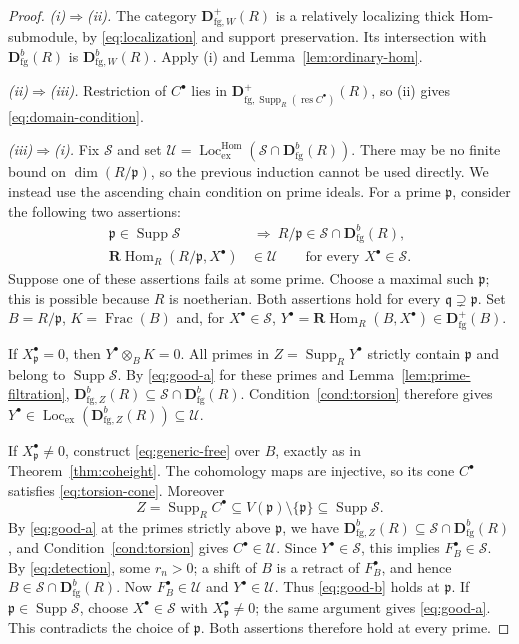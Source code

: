 \documentclass[11pt]{amsart}
\numberwithin{equation}{section}
\theoremstyle{definition}
\theoremstyle{remark}
\DeclareMathOperator{\Supp}{Supp}
\DeclareMathOperator{\Loc}{Loc}
\DeclareMathOperator{\Hom}{Hom}
\DeclareMathOperator{\Frac}{Frac}
\DeclareMathOperator{\res}{res}
\newcommand{\RHom}{\mathbf R\!\Hom}
\newcommand{\D}{\mathbf D}
\newcommand{\fg}{\mathrm{fg}}
\newcommand{\Lex}{\Loc_{\mathrm{ex}}}
\newcommand{\Lhom}{\Loc_{\mathrm{ex}}^{\Hom}}
\newcommand{\p}{\mathfrak p}
\newcommand{\q}{\mathfrak q}
\begin{document}
\begin{proof}
\emph{(i)$\Rightarrow$(ii).} The category $\D^+_{\fg,W}(R)$ is a relatively
localizing thick Hom-submodule, by \eqref{eq:localization} and support
preservation. Its intersection with $\D^b_{\fg}(R)$ is
$\D^b_{\fg,W}(R)$. Apply (i) and
Lemma~\ref{lem:ordinary-hom}.

\emph{(ii)$\Rightarrow$(iii).} Restriction of $C^{\bullet}$ lies in
$\D^+_{\fg,\Supp_R(\res C^{\bullet})}(R)$, so (ii) gives \eqref{eq:domain-condition}.

\emph{(iii)$\Rightarrow$(i).} Fix $\mathcal S$ and set
$\mathcal U=\Lhom(\mathcal S\cap\D^b_{\fg}(R))$. There may be no finite
bound on $\dim(R/\p)$, so the previous induction cannot be used directly.
We instead use the ascending chain condition on prime ideals. For a
prime $\p$, consider the following two assertions:
\begin{align}
 \p\in\Supp\mathcal S&\ \Longrightarrow\ R/\p\in\mathcal S\cap\D^b_{\fg}(R),
 \label{eq:good-a}\\
 \RHom_R(R/\p,X^{\bullet})&\in\mathcal U\qquad\text{for every }X^{\bullet}\in\mathcal S.
 \label{eq:good-b}
\end{align}
Suppose one of these assertions fails at some prime. Choose a
maximal such $\p$; this is possible because $R$ is noetherian.
Both assertions hold for every $\q\supsetneq\p$.
Set $B=R/\p$, $K=\Frac(B)$ and, for $X^{\bullet}\in\mathcal S$,
$Y^{\bullet}=\RHom_R(B,X^{\bullet})\in\D^+_{\fg}(B)$.

If $X_\p^{\bullet}=0$, then $Y^{\bullet}\otimes_BK=0$. All primes in $Z=\Supp_R Y^{\bullet}$ strictly
contain $\p$ and belong to $\Supp\mathcal S$. By
\eqref{eq:good-a} for these primes and Lemma~\ref{lem:prime-filtration},
$\D^b_{\fg,Z}(R)\subseteq\mathcal S\cap\D^b_{\fg}(R)$. Condition~\ref{cond:torsion}
therefore gives $Y^{\bullet}\in\Lex(\D^b_{\fg,Z}(R))\subseteq\mathcal U$.

If $X_\p^{\bullet}\ne0$, construct \eqref{eq:generic-free} over $B$, exactly as in
Theorem~\ref{thm:coheight}. The cohomology maps are injective, so its cone
$C^{\bullet}$ satisfies \eqref{eq:torsion-cone}. Moreover
\[
 Z=\Supp_R C^{\bullet}\subseteq V(\p)\setminus\{\p\}
 \subseteq\Supp\mathcal S.
\]
By \eqref{eq:good-a} at the primes strictly above $\p$, we have
$\D^b_{\fg,Z}(R)\subseteq\mathcal S\cap\D^b_{\fg}(R)$, and
Condition~\ref{cond:torsion} gives $C^{\bullet}\in\mathcal U$.
Since $Y^{\bullet}\in\mathcal S$, this implies $F_B^{\bullet}\in\mathcal S$.
By \eqref{eq:detection}, some $r_n>0$; a shift of $B$ is a retract of
$F_B^{\bullet}$, and hence $B\in\mathcal S\cap\D^b_{\fg}(R)$. Now $F_B^{\bullet}\in\mathcal U$ and
$Y^{\bullet}\in\mathcal U$.
Thus \eqref{eq:good-b} holds at $\p$. If $\p\in\Supp\mathcal S$,
choose $X^{\bullet}\in\mathcal S$ with $X_\p^{\bullet}\ne0$; the same argument
gives \eqref{eq:good-a}. This contradicts the choice of $\p$.
Both assertions therefore hold at every prime.


\end{proof}
\end{document}
